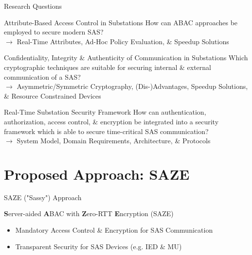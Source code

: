 \documentclass[en]{sdqbeamer}
\begin{document}
\begin{frame}{Research Questions}
    \begin{greenblock}{Attribute-Based Access Control in Substations}
        How can ABAC approaches be employed to secure modern SAS?
        \\$\rightarrow$ Real-Time Attributes, Ad-Hoc Policy Evaluation, \& Speedup Solutions
    \end{greenblock}

    \begin{greenblock}{Confidentiality, Integrity \& Authenticity of Communication in Substations}
        Which cryptographic techniques are suitable for securing internal \& external communication of a SAS?
        \\$\rightarrow$ Asymmetric/Symmetric Cryptography, (Dis-)Advantages, Speedup Solutions, \& Resource Constrained Devices
    \end{greenblock}

    \begin{greenblock}{Real-Time Substation Security Framework}
        How can authentication, authorization, access control, \& encryption be integrated into a security framework which is able to secure time-critical SAS communication?
        \\$\rightarrow$ System Model, Domain Requirements, Architecture, \& Protocols
    \end{greenblock}
\end{frame}

\section{Proposed Approach: SAZE}
\begin{frame}{SAZE ("Sassy") Approach}
    \begin{greenblock}{\textbf{S}erver-aided \textbf{A}BAC with \textbf{Z}ero-RTT \textbf{E}ncryption (SAZE)}
        \begin{itemize}
            \item Mandatory Access Control \& Encryption for SAS Communication
            \item Transparent Security for SAS Devices (e.g. IED \& MU)
        \end{itemize}
    \end{greenblock}
\end{frame}
\end{document}
